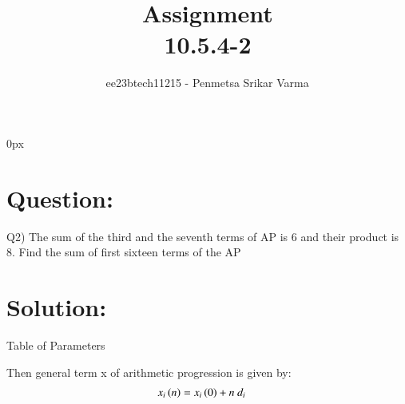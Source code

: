 \documentclass[beamer]{IEEEtran}
\theoremstyle{remark}
\begin{document}
\parindent 0px


\title{Assignment\\[1ex]10.5.4-2}
\author{ee23btech11215 - Penmetsa Srikar Varma$^{}$%
}
\maketitle
\newpage
\bigskip

\renewcommand{\thefigure}{\theenumi}
\renewcommand{\thetable}{\theenumi}
\section*{Question:}
Q2) The sum of the third and the seventh terms of AP is 6 and their product is 8. Find the sum of first sixteen terms of the AP\\
\section*{Solution:}
{
\centering
Table of Parameters\\
}
\begin{table}[h]
    \centering
    
    \label{table of parameters}
\end{table}

Then general term x of arithmetic progression is given by:
\begin{align}
\label{q1}
x_i\left(n\right)&=x_i\left(0\right)+n\ d_i
\end{align}
 
\end{document}
